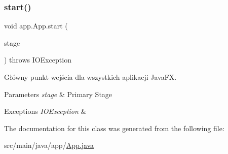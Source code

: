 \subsubsection{\texorpdfstring{start()}{start()}}
{\footnotesize\ttfamily void app.\+App.\+start (\begin{DoxyParamCaption}\item[{Stage}]{stage }\end{DoxyParamCaption}) throws I\+O\+Exception}

Główny punkt wejścia dla wszystkich aplikacji Java\+FX. 
\begin{DoxyParams}{Parameters}
{\em stage} & Primary Stage \\
\hline
\end{DoxyParams}

\begin{DoxyExceptions}{Exceptions}
{\em I\+O\+Exception} & \\
\hline
\end{DoxyExceptions}


The documentation for this class was generated from the following file\+:\begin{DoxyCompactItemize}
\item 
src/main/java/app/\mbox{\hyperlink{_app_8java}{App.\+java}}\end{DoxyCompactItemize}
